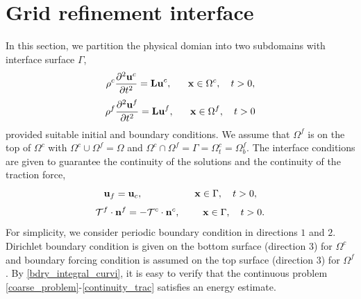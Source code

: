 \documentclass[a4paper]{article}
\begin{document}
\section{Grid refinement interface}
In this section, we partition the physical domian into two subdomains with interface surface $\Gamma$,
\begin{equation}\label{coarse_problem}
\rho^c\frac{\partial ^2 {\bf u}^c}{\partial t^2} = {\bf Lu}^c, \ \ \ \ \ {\bf x} \in \Omega^c,\ \ \ t>0,
\end{equation}
\begin{equation}\label{fine_problem}
\rho^f\frac{\partial ^2 {\bf u}^f}{\partial t^2} = {\bf Lu}^f, \ \ \ \ \ {\bf x} \in \Omega^f,\ \ \ t>0
\end{equation}
provided suitable initial and boundary conditions. We assume that $\Omega^f$ is on the top of $\Omega^c$ with $\Omega^c\cup\Omega^f = \Omega$ and $\Omega^c\cap\Omega^f = \Gamma=\Omega^c_t =\Omega^f_b $. The interface conditions are given to guarantee the continuity of the solutions and the continuity of the traction force,
\begin{equation}\label{continuity_sol}
{\bf u}_f = {\bf u}_c, \ \ \ \ \ \ \ \ \ \ \ \ \ \ \ \ {\bf x}\in \Gamma, \ \ \ t>0, 
\end{equation}
\begin{equation}\label{continuity_trac}
\mathcal{T}^f\cdot{\bf n}^f = -\mathcal{T}^c\cdot{\bf n}^c,  \ \ \ \ \ \ \  {\bf x}\in \Gamma, \ \ \ t>0.
\end{equation}
For simplicity, we consider periodic boundary condition in directions $1$ and $2$. Dirichlet boundary condition is given on the bottom surface (direction $3$) for $\Omega^c$ and boundary forcing condition is assumed on the top surface (direction $3$) for $\Omega^f$. By \eqref{bdry_integral_curvi}, it is easy to verify that the continuous problem \eqref{coarse_problem}-\eqref{continuity_trac} satisfies an energy estimate.
\end{document}
